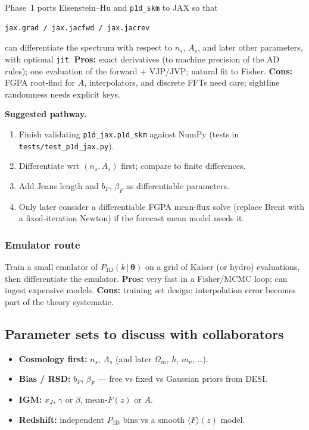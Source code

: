 \documentclass[11pt]{article}
\begin{document}
Phase~1 ports Eisenstein--Hu and \texttt{p1d\_skm} to JAX so that
\begin{verbatim}
jax.grad / jax.jacfwd / jax.jacrev
\end{verbatim}
can differentiate the spectrum with respect to $n_s$, $A_s$, and later other parameters, with optional \texttt{jit}.
\textbf{Pros:} exact derivatives (to machine precision of the AD rules); one evaluation of the forward + VJP/JVP; natural fit to Fisher.
\textbf{Cons:} FGPA root-find for $A$, interpolators, and discrete FFTs need care; sightline randomness needs explicit keys.

\textbf{Suggested pathway.}
\begin{enumerate}
\item Finish validating \texttt{p1d\_jax.p1d\_skm} against NumPy (tests in \texttt{tests/test\_p1d\_jax.py}).
\item Differentiate wrt $(n_s,A_s)$ first; compare to finite differences.
\item Add Jeans length and $b_F$, $\beta_F$ as differentiable parameters.
\item Only later consider a differentiable FGPA mean-flux solve (replace Brent with a fixed-iteration Newton) if the forecast mean model needs it.
\end{enumerate}

\subsubsection{Emulator route}

Train a small emulator of $P_{1\mathrm{D}}(k\,|\,\boldsymbol{\theta})$ on a grid of Kaiser (or hydro) evaluations, then differentiate the emulator.
\textbf{Pros:} very fast in a Fisher/MCMC loop; can ingest expensive models.
\textbf{Cons:} training set design; interpolation error becomes part of the theory systematic.

\subsection{Parameter sets to discuss with collaborators}

\begin{itemize}
\item \textbf{Cosmology first:} $n_s$, $A_s$ (and later $\Omega_m$, $h$, $m_\nu$, \ldots).
\item \textbf{Bias / RSD:} $b_F$, $\beta_F$ --- free vs fixed vs Gaussian priors from DESI.
\item \textbf{IGM:} $x_J$, $\gamma$ or $\beta$, mean-$F(z)$ or $A$.
\item \textbf{Redshift:} independent $P_{1\mathrm{D}}$ bins vs a smooth $\langle F\rangle(z)$ model.
\end{itemize}
\end{document}
